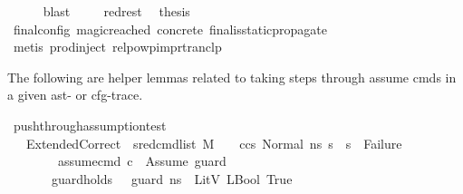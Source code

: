 \begin{isabellebody}
\ \ \ \ \isamarkupfalse%
\ blast\ \isanewline
\ \ \isamarkupfalse%
\ red{\isacharunderscore}{\kern0pt}rest\ \isamarkupfalse%
\ {\isacharquery}{\kern0pt}thesis\ \isamarkupfalse%
\ final{\isacharunderscore}{\kern0pt}config\ magic{\isacharunderscore}{\kern0pt}reached\ concrete\ final{\isacharunderscore}{\kern0pt}is{\isacharunderscore}{\kern0pt}static{\isacharunderscore}{\kern0pt}propagate\ \isanewline
\ \ \ \ \isamarkupfalse%
\ {\isacharparenleft}{\kern0pt}metis\ prod{\isachardot}{\kern0pt}inject\ relpowp{\isacharunderscore}{\kern0pt}imp{\isacharunderscore}{\kern0pt}rtranclp{\isacharparenright}{\kern0pt}\isanewline
{}\isamarkupfalse%
%
\endisatagproof
{\isafoldproof}%
%
\isadelimproof
%
\endisadelimproof
%
\begin{isamarkuptext}%
The following are helper lemmas related to taking steps through assume cmds in a given ast- or cfg-trace.%
\end{isamarkuptext}\isamarkuptrue%
\isamarkupfalse%
\ push{\isacharunderscore}{\kern0pt}through{\isacharunderscore}{\kern0pt}assumption{\isacharunderscore}{\kern0pt}test{}{\isacharcolon}{\kern0pt}\ \isanewline
\ \ \ ExtendedCorrect{\isacharcolon}{\kern0pt}\ {\isachardoublequoteopen}{\isacharparenleft}{\kern0pt}{\isasymAnd}\ s{}{\isacharprime}{\kern0pt}{\isachardot}{\kern0pt}{\isacharparenleft}{\kern0pt}red{\isacharunderscore}{\kern0pt}cmd{\isacharunderscore}{\kern0pt}list\ M\ {\isasymLambda}\ {\isasymGamma}\ {\isasymOmega}\ {\isacharparenleft}{\kern0pt}c{\isacharhash}{\kern0pt}cs{}{\isacharparenright}{\kern0pt}\ {\isacharparenleft}{\kern0pt}Normal\ ns{}{\isacharparenright}{\kern0pt}\ s{}{\isacharprime}{\kern0pt}{\isacharparenright}{\kern0pt}\ {\isasymLongrightarrow}\ s{}{\isacharprime}{\kern0pt}\ {\isasymnoteq}\ Failure{\isacharparenright}{\kern0pt}{\isachardoublequoteclose}\isanewline
\ \ \ \ \ \ \ \ assume{\isacharunderscore}{\kern0pt}cmd{\isacharcolon}{\kern0pt}\ {\isachardoublequoteopen}c\ {\isacharequal}{\kern0pt}\ Assume\ guard{\isachardoublequoteclose}\isanewline
\ \ \ \ \ \ \ guard{\isacharunderscore}{\kern0pt}holds{\isacharcolon}{\kern0pt}\ {\isachardoublequoteopen}{\isasymLambda}{\isacharcomma}{\kern0pt}{\isasymGamma}{\isacharcomma}{\kern0pt}{\isasymOmega}\ {\isasymturnstile}\ {\isasymlangle}guard{\isacharcomma}{\kern0pt}\ ns{}{\isasymrangle}\ {\isasymDown}\ LitV\ {\isacharparenleft}{\kern0pt}LBool\ True{\isacharparenright}{\kern0pt}{\isachardoublequoteclose}\isanewline

\end{isabellebody}
